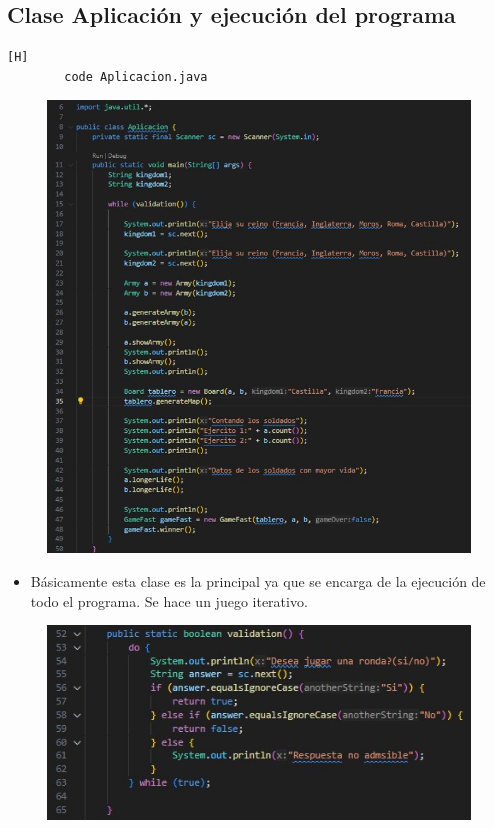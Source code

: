 \documentclass{article}
\begin{document}
	
	
	\subsection{Clase Aplicación y ejecución del programa}
	
	
	\begin{lstlisting}[language=bash,caption={Se crea la clase principal que llama a todas las clases}][H]
		code Aplicacion.java
	\end{lstlisting}
	\begin{figure}[H]
		\centering
		\includegraphics[width=1\textwidth,keepaspectratio]{img/main.jpg}
	\end{figure}
	\begin{itemize}	
		\item Básicamente esta clase es la principal ya que se encarga de la ejecución de todo el programa. Se hace un juego iterativo.
	\end{itemize}
	
	\begin{figure}[H]
		\centering
		\includegraphics[width=1\textwidth,keepaspectratio]{img/validation.jpg}
	\end{figure}	
	
\end{document}

